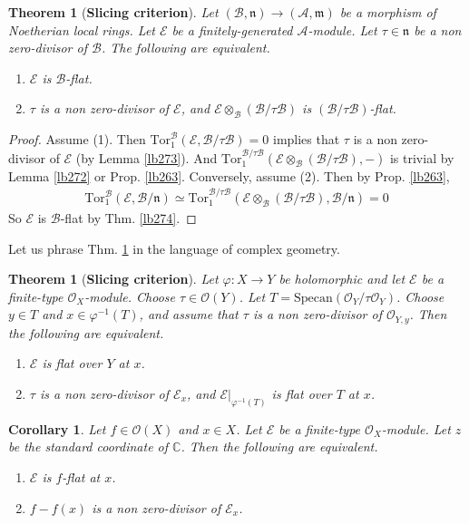 \documentclass[12pt,b5paper,notitlepage]{report}
\theoremstyle{definition}
\theoremstyle{plain}
\newtheorem{thm}[df]{Theorem}
\newtheorem{co}[df]{Corollary}
\newcommand{\fk}{\mathfrak}
\newcommand{\mc}{\mathcal}
\newcommand{\scr}{\mathscr}
\newcommand{\Cbb}{\mathbb C}
\newcommand{\Specan}{\mathrm{Specan}}
\newcommand{\Tor}{\mathrm{Tor}}
\newcommand{\nk}{\mathfrak n}
\numberwithin{equation}{section}
\begin{document}
\begin{thm}[\textbf{Slicing criterion}]\label{lb275}
Let $(\mc B,\fk n)\rightarrow(\mc A,\fk m)$ be a morphism of Noetherian local rings. Let $\mc E$ be a finitely-generated $\mc A$-module. Let $\tau\in\nk$ be a non zero-divisor of $\mc B$. The following are equivalent.
\begin{enumerate}[label=(\arabic*)]
\item $\mc E$ is $\mc B$-flat.
\item $\tau$ is a non zero-divisor of $\mc E$, and $\mc E\otimes_{\mc B}(\mc B/\tau\mc B)$ is $(\mc B/\tau\mc B)$-flat.
\end{enumerate}
\end{thm}


\begin{proof}
Assume (1). Then $\Tor_1^{\mc B}(\mc E,\mc B/\tau\mc B)=0$ implies that $\tau$ is a non zero-divisor of $\mc E$ (by Lemma \ref{lb273}). And $\Tor_1^{\mc B/\tau\mc B}(\mc E\otimes_{\mc B}(\mc B/\tau\mc B),-)$ is trivial by Lemma \ref{lb272} or Prop. \ref{lb263}. Conversely, assume (2). Then by Prop. \ref{lb263},
\begin{align*}
\Tor_1^{\mc B}(\mc E,\mc B/\nk)\simeq\Tor_1^{\mc B/\tau\mc B}(\mc E\otimes_{\mc B}(\mc B/\tau\mc B),\mc B/\nk)=0
\end{align*}
So $\mc E$ is $\mc B$-flat by Thm. \ref{lb274}.
\end{proof}



Let us phrase Thm. \ref{lb275} in the language of complex geometry.


\begin{thm}[\textbf{Slicing criterion}]\label{lb264}   
Let $\varphi:X\rightarrow Y$ be holomorphic and let $\scr E$ be a finite-type $\scr O_X$-module. Choose $\tau\in\scr O(Y)$. Let $T=\Specan(\scr O_Y/\tau\scr O_Y)$. Choose $y\in T$ and $x\in\varphi^{-1}(T)$, and assume that $\tau$ is a non zero-divisor of $\scr O_{Y,y}$. Then the following are equivalent.
\begin{enumerate}[label=(\arabic*)]
\item $\scr E$ is flat over $Y$ at $x$.
\item $\tau$ is a non zero-divisor of $\scr E_x$, and $\scr E|_{\varphi^{-1}(T)}$ is flat over $T$ at $x$.
\end{enumerate}
\end{thm}




\begin{co}\label{lb276}
Let $f\in\scr O(X)$ and $x\in X$. Let $\scr E$ be a finite-type $\scr O_X$-module. Let $z$ be the standard coordinate of $\Cbb$. Then the following are equivalent.
\begin{enumerate}[label=(\arabic*)]
\item $\scr E$ is $f$-flat at $x$.
\item $f-f(x)$ is a non zero-divisor of $\scr E_x$.
\end{enumerate}
\end{co}
\end{document}
